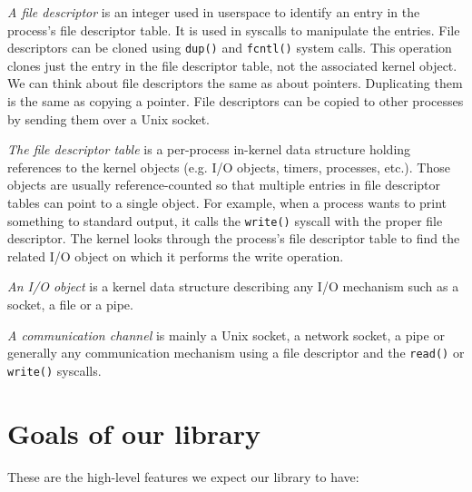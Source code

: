 \emph{A file descriptor} is an integer used in userspace to identify an entry in the process's file descriptor table. It is used in syscalls to manipulate the entries. File descriptors can be cloned using {\tt dup()} and {\tt fcntl()} system calls. This operation clones just the entry in the file descriptor table, not the associated kernel object. We can think about file descriptors the same as about pointers. Duplicating them is the same as copying a pointer. File descriptors can be copied to other processes by sending them over a Unix socket.

\emph{The file descriptor table} is a per-process in-kernel data structure holding references to the kernel objects (e.g. I/O objects, timers, processes, etc.). Those objects are usually reference-counted so that multiple entries in file descriptor tables can point to a single object. For example, when a process wants to print something to standard output, it calls the {\tt write()} syscall with the proper file descriptor. The kernel looks through the process's file descriptor table to find the related I/O object on which it performs the write operation.

\emph{An I/O object} is a kernel data structure describing any I/O mechanism such as a socket, a file or a pipe.

\emph{A communication channel} is mainly a Unix socket, a network socket, a pipe or generally any communication mechanism using a file descriptor and the {\tt read()} or {\tt write()} syscalls.

\section{Goals of our library}

These are the high-level features we expect our library to have:

